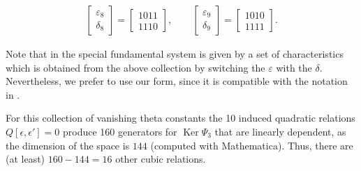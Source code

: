 \documentclass[pdftex]{sigma}
\numberwithin{equation}{section}
\newcommand{\de}{\delta}
\newcommand{\ep}{\varepsilon}
\begin{document}
\begin{gather}
\left[\begin{matrix}\ep_8 \\ \de_8 \end{matrix}\right]=\begin{bmatrix} 1 0 1 1 \\ 1 1 1 0 \end{bmatrix}, \qquad \left[\begin{matrix}\ep_9 \\ \de_ 9 \end{matrix}\right]=\begin{bmatrix} 1 0 1 0 \\ 1 1 1 1 \end{bmatrix}.\label{10vanishing}
\end{gather}

Note that in \cite{Ig} the special fundamental system is given by a set of characteristics which is obtained from the above collection by switching the $\ep$ with the $\de$. Nevertheless, we prefer to use our form, since it is compatible with the notation in \cite{Gr}.

For this collection of vanishing theta constants the 10 induced quadratic relations $Q [ \epsilon , \epsilon ' ]=0$ produce 160 generators for $\operatorname{Ker} \Psi_3$ that are linearly dependent, as the dimension of the space is $144$ (computed with Mathematica).
Thus, there are (at least) $160 -144 = 16$ other cubic relations.
\end{document}
